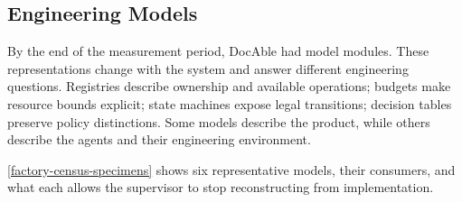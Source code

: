 \subsection{Engineering Models}\label{heading:what-the-factory-knows}


By the end of the measurement period, DocAble had  model modules. These representations change with the system and answer different engineering questions. Registries describe ownership and available operations; budgets make resource bounds explicit; state machines expose legal transitions; decision tables preserve policy distinctions. Some models describe the product, while others describe the agents and their engineering environment.


\autoref{factory-census-specimens} shows six representative models, their consumers, and what each allows the supervisor to stop reconstructing from implementation.

